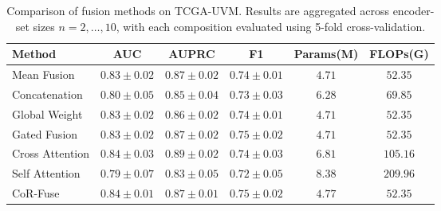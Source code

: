 \begin{table}[!ht]
\centering
\caption{
Comparison of fusion methods on TCGA-UVM.
Results are aggregated across encoder-set sizes $n=2,\ldots,10$, with each composition evaluated using 5-fold cross-validation.}
\label{tab:scaling_law_variance}
\begin{tabular}{lccccc}
\toprule
Method & AUC & AUPRC & F1 & Params(M) & FLOPs(G) \\
\midrule
Mean Fusion & $0.83 \pm 0.02$ & $0.87 \pm 0.02$ & $0.74 \pm 0.01$ & $4.71$ & $52.35$ \\
Concatenation & $0.80 \pm 0.05$ & $0.85 \pm 0.04$ & $0.73 \pm 0.03$ & $6.28$ & $69.85$ \\
Global Weight & $0.83 \pm 0.02$ & $0.86 \pm 0.02$ & $0.74 \pm 0.01$ & $4.71$ & $52.35$ \\
Gated Fusion & $0.83 \pm 0.02$ & $0.87 \pm 0.02$ & $0.75 \pm 0.02$ & $4.71$ & $52.35$ \\
Cross Attention & $0.84 \pm 0.03$ & $0.89 \pm 0.02$ & $0.74 \pm 0.03$ & $6.81$ & $105.16$ \\
Self Attention & $0.79 \pm 0.07$ & $0.83 \pm 0.05$ & $0.72 \pm 0.05$ & $8.38$ & $209.96$ \\
CoR-Fuse & $0.84 \pm 0.01$ & $0.87 \pm 0.01$ & $0.75 \pm 0.02$ & $4.77$ & $52.35$ \\
\bottomrule
\end{tabular}
\end{table}

